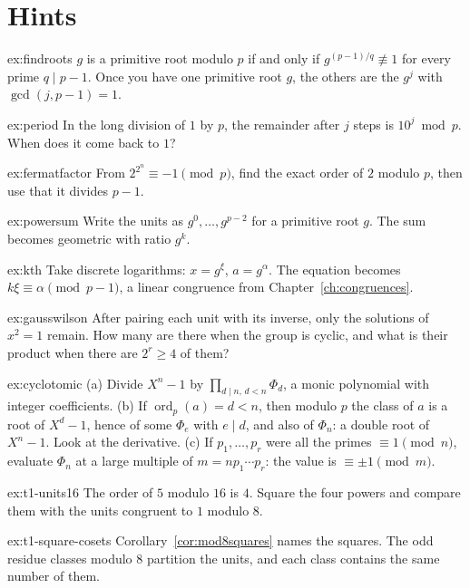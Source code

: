 \section{Hints}

\begin{hint}{ex:findroots}
$g$ is a primitive root modulo $p$ if and only if $g^{(p-1)/q}\not\equiv1$ for every prime $q\mid p-1$. Once you have one primitive root $g$, the others are the $g^j$ with $\gcd(j,p-1)=1$.
\end{hint}
\begin{hint}{ex:period}
In the long division of $1$ by $p$, the remainder after $j$ steps is $10^j\bmod p$. When does it come back to $1$?
\end{hint}
\begin{hint}{ex:fermatfactor}
From $2^{2^n}\equiv-1\pmod p$, find the exact order of $2$ modulo $p$, then use that it divides $p-1$.
\end{hint}
\begin{hint}{ex:powersum}
Write the units as $g^0,\dots,g^{p-2}$ for a primitive root $g$. The sum becomes geometric with ratio $g^k$.
\end{hint}
\begin{hint}{ex:kth}
Take discrete logarithms: $x=g^\xi$, $a=g^\alpha$. The equation becomes $k\xi\equiv\alpha\pmod{p-1}$, a linear congruence from Chapter~\ref{ch:congruences}.
\end{hint}
\begin{hint}{ex:gausswilson}
After pairing each unit with its inverse, only the solutions of $x^2=1$ remain. How many are there when the group is cyclic, and what is their product when there are $2^r\ge4$ of them?
\end{hint}
\begin{hint}{ex:cyclotomic}
(a) Divide $X^n-1$ by $\prod_{d\mid n,\,d<n}\Phi_d$, a monic polynomial with integer coefficients. (b) If $\operatorname{ord}_p(a)=d<n$, then modulo $p$ the class of $a$ is a root of $X^d-1$, hence of some $\Phi_e$ with $e\mid d$, and also of $\Phi_n$: a double root of $X^n-1$. Look at the derivative. (c) If $p_1,\dots,p_r$ were all the primes $\equiv1\pmod n$, evaluate $\Phi_n$ at a large multiple of $m=np_1\cdots p_r$: the value is $\equiv\pm1\pmod m$.
\end{hint}
\begin{hint}{ex:t1-units16}
The order of $5$ modulo $16$ is $4$. Square the four powers and compare them with the units congruent to $1$ modulo $8$.
\end{hint}
\begin{hint}{ex:t1-square-cosets}
Corollary~\ref{cor:mod8squares} names the squares. The odd residue classes modulo $8$ partition the units, and each class contains the same number of them.
\end{hint}

